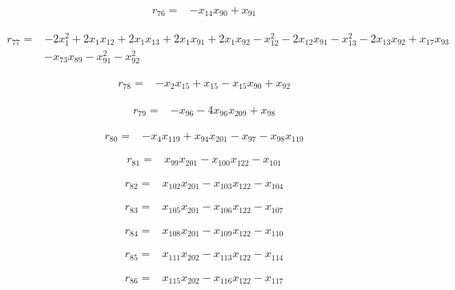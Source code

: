 \documentclass[10pt,letterpaper]{article}
\theoremstyle{remark}\newtheorem{remark}[theorem]{Remark}
\begin{document}
\begin{align*}
r_{76}={}&-x_{14}x_{90}+x_{91}
\end{align*}

\begin{align*}
r_{77}={}&-2x_{1}^{2}+2x_{1}x_{12}+2x_{1}x_{13}+2x_{1}x_{91}+2x_{1}x_{92}-x_{12}^{2}-2x_{12}x_{91}-x_{13}^{2}-2x_{13}x_{92}+x_{17}x_{93}\\
&-x_{73}x_{89}-x_{91}^{2}-x_{92}^{2}
\end{align*}

\begin{align*}
r_{78}={}&-x_{2}x_{15}+x_{15}-x_{15}x_{90}+x_{92}
\end{align*}

\begin{align*}
r_{79}={}&-x_{96}-4x_{96}x_{209}+x_{98}
\end{align*}

\begin{align*}
r_{80}={}&-x_{4}x_{119}+x_{94}x_{201}-x_{97}-x_{98}x_{119}
\end{align*}

\begin{align*}
r_{81}={}&x_{99}x_{201}-x_{100}x_{122}-x_{101}
\end{align*}

\begin{align*}
r_{82}={}&x_{102}x_{201}-x_{103}x_{122}-x_{104}
\end{align*}

\begin{align*}
r_{83}={}&x_{105}x_{201}-x_{106}x_{122}-x_{107}
\end{align*}

\begin{align*}
r_{84}={}&x_{108}x_{201}-x_{109}x_{122}-x_{110}
\end{align*}

\begin{align*}
r_{85}={}&x_{111}x_{202}-x_{113}x_{122}-x_{114}
\end{align*}

\begin{align*}
r_{86}={}&x_{115}x_{202}-x_{116}x_{122}-x_{117}
\end{align*}
\end{document}

